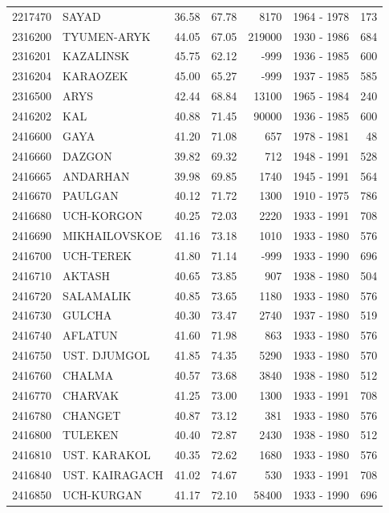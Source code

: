 \begin{longtable}{lp{4.3cm}llrlr}
2217470 & SAYAD & 36.58 & 67.78 & 8170 & 1964 - 1978 & 173 \\
2316200 & TYUMEN-ARYK & 44.05 & 67.05 & 219000 & 1930 - 1986 & 684 \\
2316201 & KAZALINSK & 45.75 & 62.12 & -999 & 1936 - 1985 & 600 \\
2316204 & KARAOZEK & 45.00 & 65.27 & -999 & 1937 - 1985 & 585 \\
2316500 & ARYS & 42.44 & 68.84 & 13100 & 1965 - 1984 & 240 \\
2416202 & KAL & 40.88 & 71.45 & 90000 & 1936 - 1985 & 600 \\
2416600 & GAYA & 41.20 & 71.08 & 657 & 1978 - 1981 & 48 \\
2416660 & DAZGON & 39.82 & 69.32 & 712 & 1948 - 1991 & 528 \\
2416665 & ANDARHAN & 39.98 & 69.85 & 1740 & 1945 - 1991 & 564 \\
2416670 & PAULGAN & 40.12 & 71.72 & 1300 & 1910 - 1975 & 786 \\
2416680 & UCH-KORGON & 40.25 & 72.03 & 2220 & 1933 - 1991 & 708 \\
2416690 & MIKHAILOVSKOE & 41.16 & 73.18 & 1010 & 1933 - 1980 & 576 \\
2416700 & UCH-TEREK & 41.80 & 71.14 & -999 & 1933 - 1990 & 696 \\
2416710 & AKTASH & 40.65 & 73.85 & 907 & 1938 - 1980 & 504 \\
2416720 & SALAMALIK & 40.85 & 73.65 & 1180 & 1933 - 1980 & 576 \\
2416730 & GULCHA & 40.30 & 73.47 & 2740 & 1937 - 1980 & 519 \\
2416740 & AFLATUN & 41.60 & 71.98 & 863 & 1933 - 1980 & 576 \\
2416750 & UST. DJUMGOL & 41.85 & 74.35 & 5290 & 1933 - 1980 & 570 \\
2416760 & CHALMA & 40.57 & 73.68 & 3840 & 1938 - 1980 & 512 \\
2416770 & CHARVAK & 41.25 & 73.00 & 1300 & 1933 - 1991 & 708 \\
2416780 & CHANGET & 40.87 & 73.12 & 381 & 1933 - 1980 & 576 \\
2416800 & TULEKEN & 40.40 & 72.87 & 2430 & 1938 - 1980 & 512 \\
2416810 & UST. KARAKOL & 40.35 & 72.62 & 1680 & 1933 - 1980 & 576 \\
2416840 & UST. KAIRAGACH & 41.02 & 74.67 & 530 & 1933 - 1991 & 708 \\
2416850 & UCH-KURGAN & 41.17 & 72.10 & 58400 & 1933 - 1990 & 696 \\

\end{longtable}
